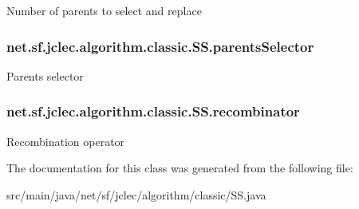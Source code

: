 Number of parents to select and replace \hypertarget{classnet_1_1sf_1_1jclec_1_1algorithm_1_1classic_1_1_s_s_a13303f23ab3c41a218578596684e5cc6}{
\subsubsection[{parents\-Selector}]{ net.\-sf.\-jclec.\-algorithm.\-classic.\-S\-S.\-parents\-Selector\hspace{0.3cm}{\ttfamily [protected]}}}\label{classnet_1_1sf_1_1jclec_1_1algorithm_1_1classic_1_1_s_s_a13303f23ab3c41a218578596684e5cc6}
Parents selector \hypertarget{classnet_1_1sf_1_1jclec_1_1algorithm_1_1classic_1_1_s_s_a90695ab6414bf0d50622b45676eb4925}{
\subsubsection[{recombinator}]{ net.\-sf.\-jclec.\-algorithm.\-classic.\-S\-S.\-recombinator\hspace{0.3cm}{\ttfamily [protected]}}}\label{classnet_1_1sf_1_1jclec_1_1algorithm_1_1classic_1_1_s_s_a90695ab6414bf0d50622b45676eb4925}
Recombination operator 

The documentation for this class was generated from the following file\-:\begin{DoxyCompactItemize}
\item 
src/main/java/net/sf/jclec/algorithm/classic/S\-S.\-java\end{DoxyCompactItemize}
